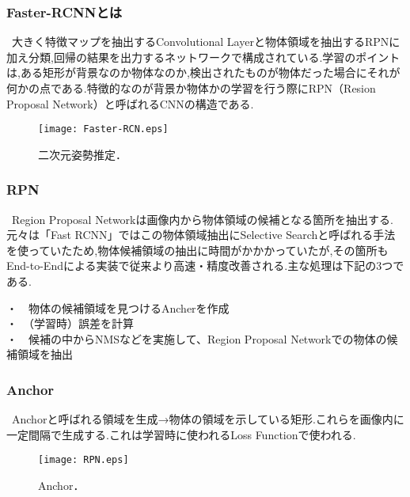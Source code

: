 \documentclass[11pt,a4j,ascmac]{jarticle}
\begin{document}
\subsubsection{Faster-RCNNとは}

\  大きく特徴マップを抽出するConvolutional Layerと物体領域を抽出するRPNに加え分類,回帰の結果を出力するネットワークで構成されている.学習のポイントは,ある矩形が背景なのか物体なのか,検出されたものが物体だった場合にそれが何かの点である.特徴的なのが背景か物体かの学習を行う際にRPN（Resion Proposal Network）と呼ばれるCNNの構造である.

    \begin{figure}[htpp]
     \centering
      \texttt{[image: Faster-RCN.eps]}
      \vspace*{30mm}
      \caption{二次元姿勢推定．}
      \label{fig:2d_pose_estimation}
    \end{figure}


\subsubsection{RPN}
\  Region Proposal Networkは画像内から物体領域の候補となる箇所を抽出する.元々は「Fast RCNN」ではこの物体領域抽出にSelective Searchと呼ばれる手法を使っていたため,物体候補領域の抽出に時間がかかかっていたが,その箇所もEnd-to-Endによる実装で従来より高速・精度改善される.主な処理は下記の3つである.


\begin{description}
    \item[・　物体の候補領域を見つけるAncherを作成]
    \item[・　（学習時）誤差を計算]
    \item[・　候補の中からNMSなどを実施して、Region Proposal Networkでの物体の候補領域を抽出]
\end{description}



\subsubsection{Anchor}
\   Anchorと呼ばれる領域を生成→物体の領域を示している矩形.これらを画像内に一定間隔で生成する.これは学習時に使われるLoss Functionで使われる.

    \begin{figure}[htpp]
     \centering
      \texttt{[image: RPN.eps]}
      \vspace*{30mm}
      \caption{Anchor．}
      \label{fig:2d_pose_estimation}
    \end{figure}
\end{document}
